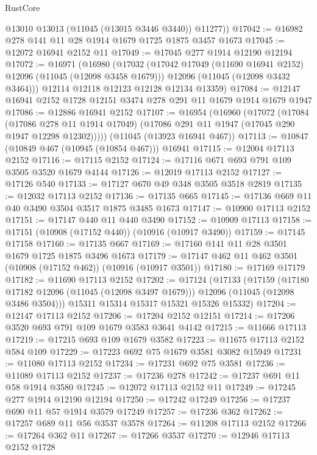 \begin{lexlean}{RustCore}
\begin{coremodule}
        @13010
        @13013
        (@11045 (@13015 @3446 @3440))
        @11277))
@17042 := @16982 @278 @141 @11 @28 @1914 @1679 @1725 @1875 @3457 @1673
@17045 := @12072 @16941 @2152 @11
@17049 := @17045 @277 @1914 @12190 @12194
@17072 := @16971
    (@16980
      (@17032
        (@17042 @17049 (@11690 @16941 @2152) @12096 (@11045 (@12098 @3458 @1679)))
        @12096
        (@11045 (@12098 @3432 @3464)))
      @12114
      @12118
      @12123
      @12128
      @12134
      @13359)
@17084 := @12147 @16941 @2152 @1728 @12151 @3474 @278 @291 @11 @1679 @1914 @1679 @1947
@17086 := @12886 @16941 @2152
@17107 := @16954
    (@16960
      (@17072
        (@17084
          (@17086 @278 @11 @1914 @17049)
          (@17086 @291 @11 @1947 (@17045 @290 @1947 @12298 @12302)))))
    (@11045 (@13923 @16941 @467))
@17113 := @10847 (@10849 @467 (@10945 (@10854 @467))) @16941
@17115 := @12004 @17113 @2152
@17116 := @17115 @2152
@17124 := @17116 @671 @693 @791 @109 @3505 @3520 @1679 @4144
@17126 := @12019 @17113 @2152
@17127 := @17126 @540
@17133 := @17127 @670 @49 @348 @3505 @3518 @2819
@17135 := @12032 @17113 @2152
@17136 := @17135 @665
@17145 := @17136 @669 @11 @40 @3490 @3504 @3517 @1875 @3485 @1673
@17147 := @10900 @17113 @2152
@17151 := @17147 @440 @11 @440 @3490
@17152 := @10909 @17113
@17158 := @17151 (@10908 (@17152 @440)) (@10916 (@10917 @3490))
@17159 := @17145 @17158
@17160 := @17135 @667
@17169 := @17160 @141 @11 @28 @3501 @1679 @1725 @1875 @3496 @1673
@17179 := @17147 @462 @11 @462 @3501 (@10908 (@17152 @462)) (@10916 (@10917 @3501))
@17180 := @17169 @17179
@17182 := @11690 @17113 @2152
@17202 := @17124
    (@17133
      (@17159
        (@17180 @17182 @12096 (@11045 (@12098 @3497 @1679)))
        @12096
        (@11045 (@12098 @3486 @3504)))
      @15311
      @15314
      @15317
      @15321
      @15326
      @15332)
@17204 := @12147 @17113 @2152
@17206 := @17204 @2152 @12151
@17214 := @17206 @3520 @693 @791 @109 @1679 @3583 @3641 @4142
@17215 := @11666 @17113
@17219 := @17215 @693 @109 @1679 @3582
@17223 := @11675 @17113 @2152 @584 @109
@17229 := @17223 @692 @75 @1679 @3581 @3082 @15949
@17231 := @11080 @17113 @2152
@17234 := @17231 @692 @75 @3581
@17236 := @11089 @17113 @2152
@17237 := @17236 @278
@17242 := @17237 @691 @11 @58 @1914 @3580
@17245 := @12072 @17113 @2152 @11
@17249 := @17245 @277 @1914 @12190 @12194
@17250 := @17242 @17249
@17256 := @17237 @690 @11 @57 @1914 @3579 @17249
@17257 := @17236 @362
@17262 := @17257 @689 @11 @56 @3537 @3578
@17264 := @11208 @17113 @2152
@17266 := @17264 @362 @11
@17267 := @17266 @3537
@17270 := @12946 @17113 @2152 @1728

\end{coremodule}
\end{lexlean}
